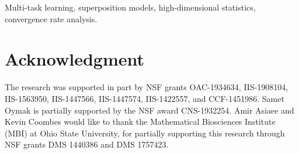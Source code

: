 \documentclass[journal, twoside]{IEEEtran}
\begin{document}



\maketitle



\begin{IEEEkeywords}
Multi-task learning, superposition models, high-dimensional statistics, convergence rate analysis.
\end{IEEEkeywords}

\IEEEpeerreviewmaketitle









%
%
%
\section*{Acknowledgment}
The research was supported in part by NSF grants OAC-1934634, IIS-1908104, IIS-1563950, IIS-1447566, IIS-1447574, IIS-1422557, and CCF-1451986. Samet Oymak is partially supported by the NSF award CNS-1932254. Amir Asiaee and Kevin Coombes would like to thank the Mathematical Biosciences Institute (MBI) at Ohio State University, for partially supporting this research through NSF grants DMS 1440386 and DMS 1757423.



\ifCLASSOPTIONcaptionsoff
  \newpage
\fi




%
\end{document}

